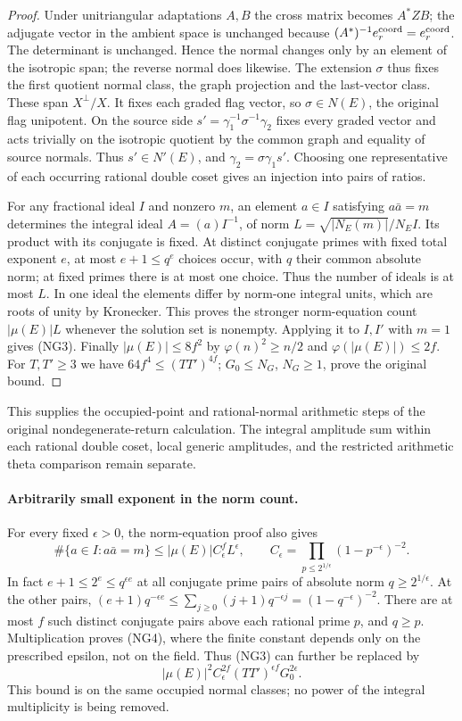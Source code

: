 \begin{proof}
Under unitriangular adaptations \(A,B\) the cross
matrix becomes \(A^*ZB\); the adjugate vector in the
ambient space is unchanged because
\((A^*)^{-1}e_r^{\rm coord}=e_r^{\rm coord}\).
The determinant is unchanged. Hence the normal changes
only by an element of the isotropic span; the reverse
normal does likewise. The extension \(\sigma\) thus
fixes the first quotient normal class, the graph
projection and the last-vector class. These span
\(X^\perp/X\). It fixes each graded flag vector, so
\(\sigma\in N(E)\), the original flag unipotent.
On the source side
\(s'=\gamma_1^{-1}\sigma^{-1}\gamma_2\) fixes every
graded vector and acts trivially on the isotropic
quotient by the common graph and equality of source
normals. Thus \(s'\in N'(E)\), and
\(\gamma_2=\sigma\gamma_1s'\).
Choosing one representative of each occurring rational
double coset gives an injection into pairs of ratios.

For any fractional ideal \(I\) and nonzero \(m\), an
element \(a\in I\) satisfying \(a\bar a=m\) determines
the integral ideal \(A=(a)I^{-1}\), of norm
\(L=\sqrt{|N_E(m)|}/N_E I\). Its product with its
conjugate is fixed. At distinct conjugate primes with
fixed total exponent \(e\), at most \(e+1\le q^e\)
choices occur, with \(q\) their common absolute norm;
at fixed primes there is at most one choice.
Thus the number of ideals is at most \(L\). In one
ideal the elements differ by norm-one integral units,
which are roots of unity by Kronecker. This proves the
stronger norm-equation count \(|\mu(E)|L\) whenever the
solution set is nonempty. Applying it to \(I,I'\) with
\(m=1\) gives (NG3). Finally \(|\mu(E)|\le8f^2\) by
\(\varphi(n)^2\ge n/2\) and \(\varphi(|\mu(E)|)\le2f\).
For \(T,T'\ge3\) we have \(64f^4\le(TT')^{4f}\);
\(G_0\le N_G\), \(N_G\ge1\), prove the original bound.
\end{proof}

This supplies the occupied-point and rational-normal
arithmetic steps of the original nondegenerate-return
calculation. The integral amplitude sum within each
rational double coset, local generic amplitudes, and
the restricted arithmetic theta comparison remain separate.

\paragraph{Arbitrarily small exponent in the norm count.}
For every fixed \(\epsilon>0\), the norm-equation proof also gives
\[
 \#\{a\in I:a\bar a=m\}
 \le |\mu(E)|C_\epsilon^f L^\epsilon,\qquad
 C_\epsilon=\prod_{p\le 2^{1/\epsilon}}
                         (1-p^{-\epsilon})^{-2}.
 \tag{NG4}
\]
In fact \(e+1\le 2^e\le q^{\epsilon e}\) at all conjugate
prime pairs of absolute norm \(q\ge 2^{1/\epsilon}\).
At the other pairs,
\((e+1)q^{-\epsilon e}\le
\sum_{j\ge0}(j+1)q^{-\epsilon j}=(1-q^{-\epsilon})^{-2}\).
There are at most \(f\) such distinct conjugate pairs
above each rational prime \(p\), and \(q\ge p\).
Multiplication proves (NG4), where the finite constant
depends only on the prescribed epsilon, not on the field.
Thus (NG3) can further be replaced by
\[
 |\mu(E)|^2 C_\epsilon^{2f}(TT')^{\epsilon f}G_0^{2\epsilon}.
\]
This bound is on the same occupied normal classes; no
power of the integral multiplicity is being removed.
